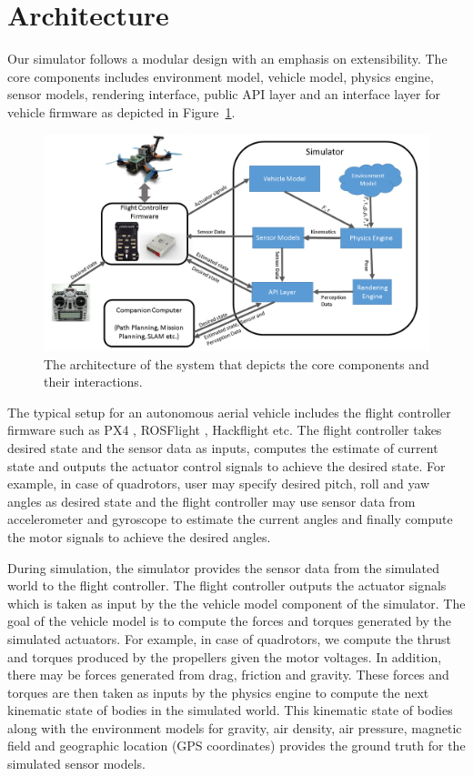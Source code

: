 \documentclass[graybox]{svmult}
\begin{document}
\section{Architecture}
Our simulator follows a modular design with an emphasis on extensibility. The core components includes environment model, vehicle model, physics engine, sensor models, rendering interface, public API layer and an interface layer for vehicle firmware as depicted in Figure~\ref{fig:arch}.

\begin{figure}[ttbp]
	\includegraphics[width=\textwidth]{overview.png}
	\caption{The architecture of the system that depicts the core components and their interactions.}
	\label{fig:arch}
\end{figure}

The typical setup for an autonomous aerial vehicle includes the flight controller firmware such as PX4 \cite{meier2011pixhawk}, ROSFlight \cite{jackson2016rosflight}, Hackflight\cite{levyHackflight} etc. The flight controller takes desired state and the sensor data as inputs, computes the estimate of current state and outputs the actuator control signals to achieve the desired state. For example, in case of quadrotors, user may specify desired pitch, roll and yaw angles as desired state and the flight controller may use sensor data from accelerometer and gyroscope to estimate the current angles and finally compute the motor signals to achieve the desired angles.

During simulation, the simulator provides the sensor data from the simulated world to the flight controller. The flight controller outputs the actuator signals which is taken as input by the the vehicle model component of the simulator. The goal of the vehicle model is to compute the forces and torques generated by the simulated actuators. For example, in case of quadrotors, we compute the thrust and torques produced by the propellers given the motor voltages. In addition, there may be forces generated from drag, friction and gravity. These forces and torques are then taken as inputs by the physics engine to compute the next kinematic state of bodies in the simulated world. This kinematic state of bodies along with the environment models for gravity, air density, air pressure, magnetic field and geographic location (GPS coordinates) provides the ground truth for the simulated sensor models.
\end{document}
